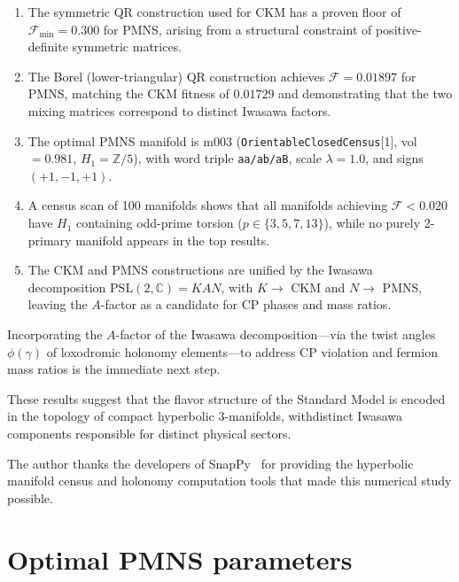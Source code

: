 \documentclass[epjc3]{svjour3}
\newcommand{\PSL}{\mathrm{PSL}(2,\mathbb{C})}
\begin{document}
\begin{enumerate}
\item The symmetric QR construction used for CKM has a proven
floor of $\mathcal{F}_{\min} = 0.300$ for PMNS, arising from a
structural constraint of positive-definite symmetric matrices.

\item The Borel (lower-triangular) QR construction achieves
$\mathcal{F} = 0.01897$ for PMNS, matching the CKM fitness of
$0.01729$ and demonstrating that the two mixing matrices
correspond to distinct Iwasawa factors.

\item The optimal PMNS manifold is m003
(\texttt{OrientableClosedCensus}[1], vol $= 0.981$,
$H_1 = \mathbb{Z}/5$), with word triple \texttt{aa/ab/aB},
scale $\lambda = 1.0$, and signs $(+1, -1, +1)$.

\item A census scan of 100 manifolds shows that all manifolds
achieving $\mathcal{F} < 0.020$ have $H_1$ containing odd-prime
torsion ($p \in \{3, 5, 7, 13\}$), while no purely 2-primary manifold
appears in the top results.

\item The CKM and PMNS constructions are unified by the Iwasawa
decomposition $\PSL = KAN$, with $K \to$ CKM and $N \to$ PMNS,
leaving the $A$-factor as a candidate for CP phases and mass ratios.
\end{enumerate}

Incorporating the $A$-factor of the Iwasawa decomposition---via
the twist angles $\phi(\gamma)$ of loxodromic holonomy elements---to
address CP violation and fermion mass ratios is the immediate next step.

These results suggest that the flavor structure of the Standard Model
is encoded in the topology of compact hyperbolic 3-manifolds, withdistinct Iwasawa components responsible for distinct physical sectors.

\begin{acknowledgement}
The author thanks the developers of SnapPy~\cite{snappy} for
providing the hyperbolic manifold census and holonomy computation
tools that made this numerical study possible.
\end{acknowledgement}

\appendix

\section{Optimal PMNS parameters}
\label{app:params}
\end{document}
